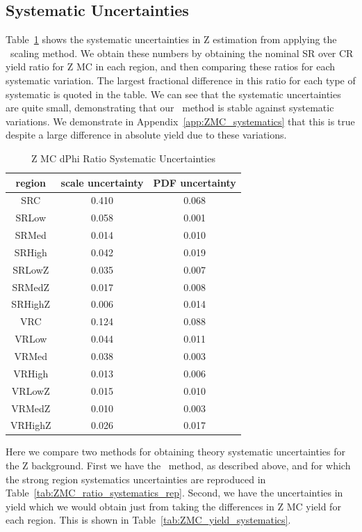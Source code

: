 
\subsection*{Systematic Uncertainties}

Table~\ref{tab:ZMC_ratio_systematics} shows the systematic uncertainties in Z estimation from applying the \mindphijm\ scaling method. We obtain these numbers by obtaining the nominal SR over CR yield ratio for Z MC in each region, and then comparing these ratios for each systematic variation. The largest fractional difference in this ratio for each type of systematic is quoted in the table. We can see that the systematic uncertainties are quite small, demonstrating that our \mindphijm\ method is stable against systematic variations. We demonstrate in Appendix~\ref{app:ZMC_systematics} that this is true despite a large difference in absolute yield due to these variations.

\begin{table}[htbp]
\caption{Z MC dPhi Ratio Systematic Uncertainties}
\begin{center}
\begin{tabular}{c|c|c}
region & scale uncertainty & PDF uncertainty \\
\hline
SRC & 0.410 & 0.068 \\
SRLow & 0.058 & 0.001 \\
SRMed & 0.014 & 0.010 \\
SRHigh & 0.042 & 0.019 \\
SRLowZ & 0.035 & 0.007 \\
SRMedZ & 0.017 & 0.008 \\
SRHighZ & 0.006 & 0.014 \\
VRC & 0.124 & 0.088 \\
VRLow & 0.044 & 0.011 \\
VRMed & 0.038 & 0.003 \\
VRHigh & 0.013 & 0.006 \\
VRLowZ & 0.015 & 0.010 \\
VRMedZ & 0.010 & 0.003 \\
VRHighZ & 0.026 & 0.017 \\
\end{tabular}
\end{center}
\label{tab:ZMC_ratio_systematics}
\end{table}


Here we compare two methods for obtaining theory systematic uncertainties for the Z background. First we have the \mindphijm\ method, as described above, and for which the strong region systematics uncertainties are reproduced in Table~\ref{tab:ZMC_ratio_systematics_rep}. Second, we have the uncertainties in yield which we would obtain just from taking the differences in Z MC yield for each region. This is shown in Table~\ref{tab:ZMC_yield_systematics}.

